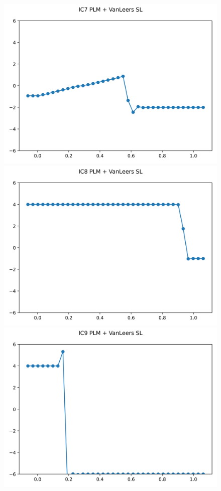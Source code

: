 \documentclass{article}
\begin{document}
\begin{figure}[t]
    \emp
        \centering
        \includegraphics[width=.95\textwidth]{../../code/unsafe_IC7Methodpv_plot.png}
        \includegraphics[width=.95\textwidth]{../../code/unsafe_IC8Methodpv_plot.png}
        \includegraphics[width=.95\textwidth]{../../code/unsafe_IC9Methodpv_plot.png}

\end{figure}
\end{document}
